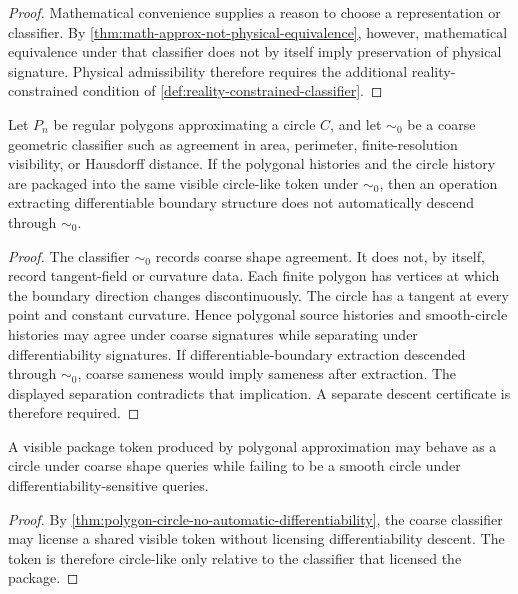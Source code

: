 \begin{proof}
Mathematical convenience supplies a reason to choose a representation or classifier. By \autoref{thm:math-approx-not-physical-equivalence}, however, mathematical equivalence under that classifier does not by itself imply preservation of physical signature. Physical admissibility therefore requires the additional reality-constrained condition of \autoref{def:reality-constrained-classifier}.
\end{proof}

\begin{theorem}
\label{thm:polygon-circle-no-automatic-differentiability}
Let $P_n$ be regular polygons approximating a circle $C$, and let $\sim_0$ be a coarse geometric classifier such as agreement in area, perimeter, finite-resolution visibility, or Hausdorff distance. If the polygonal histories and the circle history are packaged into the same visible circle-like token under $\sim_0$, then an operation extracting differentiable boundary structure does not automatically descend through $\sim_0$.
\end{theorem}

\begin{proof}
The classifier $\sim_0$ records coarse shape agreement. It does not, by itself, record tangent-field or curvature data. Each finite polygon has vertices at which the boundary direction changes discontinuously. The circle has a tangent at every point and constant curvature. Hence polygonal source histories and smooth-circle histories may agree under coarse signatures while separating under differentiability signatures. If differentiable-boundary extraction descended through $\sim_0$, coarse sameness would imply sameness after extraction. The displayed separation contradicts that implication. A separate descent certificate is therefore required.
\end{proof}

\begin{corollary}
\label{cor:circle-like-token-classifier-relative}
A visible package token produced by polygonal approximation may behave as a circle under coarse shape queries while failing to be a smooth circle under differentiability-sensitive queries.
\end{corollary}

\begin{proof}
By \autoref{thm:polygon-circle-no-automatic-differentiability}, the coarse classifier may license a shared visible token without licensing differentiability descent. The token is therefore circle-like only relative to the classifier that licensed the package.
\end{proof}

